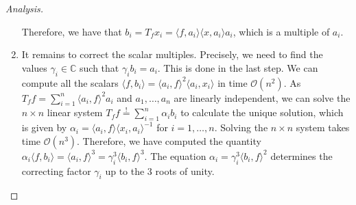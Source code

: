 \begin{proof}[Analysis]
\begin{enumerate}
		Therefore, we have that $ b_i = T_fx_i = \langle f, a_i \rangle \langle x, a_i \rangle a_i$, which is a multiple of $ a_i $. 
		\item It remains to correct the scalar multiples. Precisely, we need to find the values $ \gamma_i \in \mathbb{C}$ such that $ \gamma_i b_i = a_i $. This is done in the last step. We can compute all the scalars $ \langle f, b_i \rangle = \langle a_i, f \rangle^2 \langle a_i, x_i \rangle $ in time $ \mathcal{O}(n^2) $. 
		As $ T_f f  = \sum_{i = 1}^{n} \langle a_i, f \rangle^2 a_i $ and $ a_1,\ldots,a_n $ are linearly independent, we can solve the $ n\times n $ linear system $ T_f f \stackrel{!}{=} \sum_{i = 1}^{n} \alpha_i b_i $ to calculate the unique solution, which is given by $ \alpha_i = \langle a_i, f \rangle \langle x_i, a_i \rangle^{-1}  $ for $ i = 1,\ldots,n $.  Solving the $ n\times n $ system takes time $ \mathcal{O}(n^3) $.  Therefore, we have computed the quantity $ \alpha_i\langle f, b_i \rangle = \langle a_i, f \rangle^3 = \gamma_i^3 \langle b_i, f \rangle^3$. The equation $ \alpha_i = \gamma_i^3 \langle b_i, f \rangle^2 $ determines the correcting factor $ \gamma_i $ up to the $ 3 $ roots of unity. 
	\end{enumerate}
\end{proof}


%
%
%

